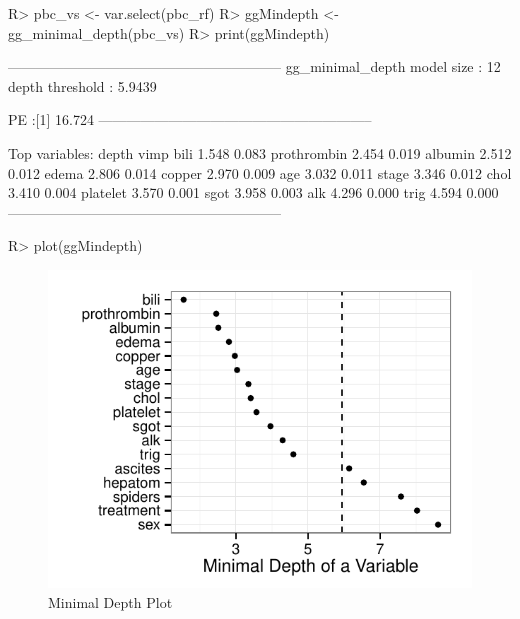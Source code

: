 \documentclass[nojss]{jss}\usepackage[]{graphicx}\usepackage[]{color}
\makeatletter
\def\maxwidth{ %
  \ifdim\Gin@nat@width>\linewidth
    \linewidth
  \else
    \Gin@nat@width
  \fi
}
\makeatother
\begin{document}
\begin{Schunk}
\begin{Sinput}
R> pbc_vs <- var.select(pbc_rf)
R> ggMindepth <- gg_minimal_depth(pbc_vs)
R> print(ggMindepth)
\end{Sinput}
\end{Schunk}

\begin{Schunk}
\begin{Soutput}
-----------------------------------------------------------
gg_minimal_depth
model size         : 12 
depth threshold    : 5.9439 

PE :[1] 16.724
-----------------------------------------------------------

Top variables:
            depth  vimp
bili        1.548 0.083
prothrombin 2.454 0.019
albumin     2.512 0.012
edema       2.806 0.014
copper      2.970 0.009
age         3.032 0.011
stage       3.346 0.012
chol        3.410 0.004
platelet    3.570 0.001
sgot        3.958 0.003
alk         4.296 0.000
trig        4.594 0.000
-----------------------------------------------------------
\end{Soutput}
\end{Schunk}

\begin{Schunk}
\begin{Sinput}
R> plot(ggMindepth)
\end{Sinput}
\begin{figure}[!htpb]

{\centering \includegraphics[width=\maxwidth]{figure/rfs-mindepth-plot-1} 

}

\caption[Minimal Depth Plot]{Minimal Depth Plot\label{fig:mindepth-plot}}
\end{figure}
\end{Schunk}
\end{document}
